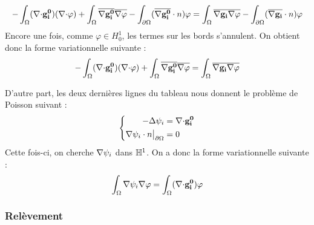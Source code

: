 \[
-\int_\Omega ({\nabla\cdot} \mathbf{g_i^0})({\nabla\cdot}\varphi) + \int_\Omega \overline{{\nabla} \mathbf{g_i^0}}\overline{{\nabla}\varphi} - \int_{\partial\Omega} (\overline{{\nabla} \mathbf{g_i^0}}\cdot n)\varphi = \int_\Omega \overline{{\nabla} \mathbf{g_i}}\overline{{\nabla}\varphi} - \int_{\partial\Omega} (\overline{{\nabla} \mathbf{g_i}}\cdot n)\varphi
\]
Encore une fois, comme $\varphi\in H^1_0$, les termes sur les bords s'annulent. On obtient donc la forme variationnelle suivante :
\begin{equation}
\label{fvgi0}
-\int_\Omega ({\nabla\cdot} \mathbf{g_i^0})({\nabla\cdot}\varphi) + \int_\Omega \overline{{\nabla} \mathbf{g_i^0}}\overline{{\nabla}\varphi} = \int_\Omega \overline{{\nabla} \mathbf{g_i}}\overline{{\nabla}\varphi}
\end{equation}

D'autre part, les deux dernières lignes du tableau nous donnent le problème de Poisson suivant :
\begin{equation}
\label{psi}
\left\{
\begin{aligned}
-{\Delta}\psi_i &= {\nabla\cdot} \mathbf{g_i^0}\\
{\nabla}\psi_i\cdot n{\big\rvert_{\partial\Omega}} &= 0
\end{aligned}
\right.
\end{equation}
Cette fois-ci, on cherche ${\nabla}\psi_i$ dans ${\mathbb{H}}^1$. On a donc la forme variationnelle suivante :
\begin{equation}
\label{fvpsi}
\int_\Omega {\nabla}\psi_i{\nabla}\varphi = \int_\Omega ({\nabla\cdot} \mathbf{g_i^0})\varphi
\end{equation}

\subsubsection{Relèvement}
\label{relev}

